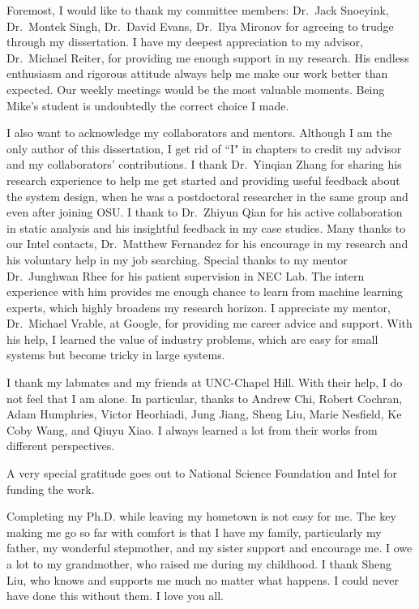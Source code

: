 Foremost,  I would like to thank my committee members: Dr.~Jack
Snoeyink, Dr.~Montek Singh, Dr.~David Evans, Dr.~Ilya Mironov for
agreeing to trudge through my dissertation. I have my deepest
appreciation to my advisor, Dr.~Michael Reiter, for providing me
enough support in my research. His endless enthusiasm and rigorous
attitude always help me make our work better than expected. Our weekly
meetings would be the most valuable moments.  Being Mike's student is
undoubtedly the correct choice I made.

I also want to acknowledge my collaborators and mentors. Although I am
the only author of this dissertation, I get rid of ``I" in chapters to
credit my advisor and my collaborators' contributions. I thank
Dr.~Yinqian Zhang for sharing his research experience to help me get
started and providing useful feedback about the system design, when
he was a postdoctoral researcher in the same group and even after
joining OSU. I thank to Dr.~Zhiyun Qian for his active collaboration
in static analysis and his insightful feedback in my case studies.
Many thanks to our Intel contacts, Dr.~Matthew Fernandez for his
encourage in my research and his voluntary help in my job searching.
Special thanks to my mentor Dr.~Junghwan Rhee for his patient
supervision in NEC Lab.  The intern experience with him provides me
enough chance to learn from machine learning experts, which highly
broadens my research horizon. I appreciate my mentor, Dr.~Michael
Vrable, at Google, for providing me career advice and support. With
his help, I learned the value of industry problems, which are easy for
small systems but become tricky in large systems.

I thank my labmates and my friends at UNC-Chapel Hill. With their
help, I do not feel that I am alone. In particular, thanks to Andrew Chi,
Robert Cochran, Adam Humphries, Victor Heorhiadi, Jung Jiang,  Sheng
Liu, Marie Nesfield, Ke Coby Wang, and Qiuyu Xiao. I always learned a
lot from their works from different perspectives. 

A very special gratitude goes out to National Science Foundation and
Intel for funding the work.

Completing my Ph.D. while leaving my hometown is not easy for me. The
key making me go so far with comfort is that I have my family,
particularly my father, my wonderful stepmother, and my sister support
and encourage me. I owe a lot to my grandmother, who raised me during
my childhood. I thank Sheng Liu, who knows and supports me much no
matter what happens. I could never have done this without them. I love
you all.
